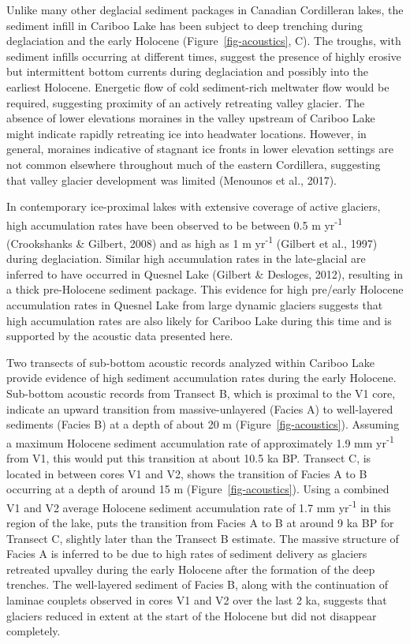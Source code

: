 \documentclass[
  letterpaper,
  DIV=11,
  numbers=noendperiod]{scrartcl}
\begin{document}
Unlike many other deglacial sediment packages in Canadian Cordilleran
lakes, the sediment infill in Cariboo Lake has been subject to deep
trenching during deglaciation and the early Holocene
(Figure~\ref{fig-acoustics}, C). The troughs, with sediment infills
occurring at different times, suggest the presence of highly erosive but
intermittent bottom currents during deglaciation and possibly into the
earliest Holocene. Energetic flow of cold sediment-rich meltwater flow
would be required, suggesting proximity of an actively retreating valley
glacier. The absence of lower elevations moraines in the valley upstream
of Cariboo Lake might indicate rapidly retreating ice into headwater
locations. However, in general, moraines indicative of stagnant ice
fronts in lower elevation settings are not common elsewhere throughout
much of the eastern Cordillera, suggesting that valley glacier
development was limited (Menounos et al., 2017).

In contemporary ice-proximal lakes with extensive coverage of active
glaciers, high accumulation rates have been observed to be between 0.5 m
yr\textsuperscript{-1} (Crookshanks \& Gilbert, 2008) and as high as 1 m
yr\textsuperscript{-1} (Gilbert et al., 1997) during deglaciation.
Similar high accumulation rates in the late-glacial are inferred to have
occurred in Quesnel Lake (Gilbert \& Desloges, 2012), resulting in a
thick pre-Holocene sediment package. This evidence for high pre/early
Holocene accumulation rates in Quesnel Lake from large dynamic glaciers
suggests that high accumulation rates are also likely for Cariboo Lake
during this time and is supported by the acoustic data presented here.

Two transects of sub-bottom acoustic records analyzed within Cariboo
Lake provide evidence of high sediment accumulation rates during the
early Holocene. Sub-bottom acoustic records from Transect B, which is
proximal to the V1 core, indicate an upward transition from
massive-unlayered (Facies A) to well-layered sediments (Facies B) at a
depth of about 20 m (Figure~\ref{fig-acoustics}). Assuming a maximum
Holocene sediment accumulation rate of approximately 1.9 mm
yr\textsuperscript{-1} from V1, this would put this transition at about
10.5 ka BP. Transect C, is located in between cores V1 and V2, shows the
transition of Facies A to B occurring at a depth of around 15 m
(Figure~\ref{fig-acoustics}). Using a combined V1 and V2 average
Holocene sediment accumulation rate of 1.7 mm yr\textsuperscript{-1} in
this region of the lake, puts the transition from Facies A to B at
around 9 ka BP for Transect C, slightly later than the Transect B
estimate. The massive structure of Facies A is inferred to be due to
high rates of sediment delivery as glaciers retreated upvalley during
the early Holocene after the formation of the deep trenches. The
well-layered sediment of Facies B, along with the continuation of
laminae couplets observed in cores V1 and V2 over the last 2 ka,
suggests that glaciers reduced in extent at the start of the Holocene
but did not disappear completely.
\end{document}
